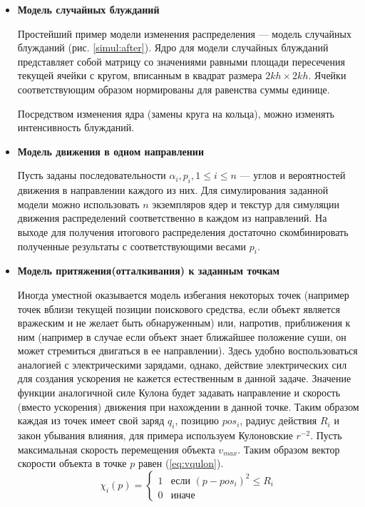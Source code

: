\begin{itemize}
\item{
\textbf{Модель случайных блужданий}

Простейший пример модели изменения распределения --- модель случайных блужданий
(рис. \ref{simul:after}). Ядро для модели случайных блужданий представляет собой матрицу со
значениями равными площади пересечения текущей ячейки с кругом, вписанным в квадрат размера
$2kh \times 2kh$. Ячейки соответствующим образом нормированы для равенства суммы единице.

Посредством изменения ядра (замены круга на кольца), можно изменять интенсивность блужданий.
}
\item{
\textbf{Модель движения в одном направлении}

Пусть заданы последовательности $\alpha_i, p_i, 1 \le i \le n$ --- углов и вероятностей
движения в направлении каждого из них. Для симулирования заданной модели можно
использовать $n$ экземпляров ядер и текстур для симуляции движения распределений
соответственно в каждом из направлений. На выходе для получения итогового распределения
достаточно скомбинировать полученные результаты с соответствующими весами $p_i$.
}
\item{
\textbf{Модель притяжения(отталкивания) к заданным точкам}

Иногда уместной оказывается модель избегания некоторых точек (например точек вблизи
текущей позиции поискового средства, если объект является вражеским и не желает быть
обнаруженным) или, напротив, приближения к ним (например в случае если объект знает ближайшее
положение суши, он может стремиться двигаться в ее направлении). Здесь 
удобно воспользоваться аналогией с электрическими зарядами, однако, действие электрических
сил для создания ускорения не кажется естественным в данной задаче. Значение функции
аналогичной силе Кулона будет задавать направление и скорость (вместо ускорения) движения
 при нахождении в данной точке. Таким образом каждая из точек имеет свой заряд $q_i$,
 позицию $pos_i$, радиус действия $R_i$ и закон убывания влияния, для примера используем
 Кулоновские $r^{-2}$. Пусть максимальная скорость перемещения объекта $v_{max}$.
Таким образом вектор скорости объекта в точке $p$ равен (\ref{eq:vqulon}).
\begin{equation}
  \chi_i(p) = 
  \left\{
    \begin{array}{ll}
      1 & \mbox{если } {(p - pos_i)^2 \le R_i} \\
      0 & \mbox{иначе }
    \end{array}
  \right.
\end{equation}

}
\end{itemize}
